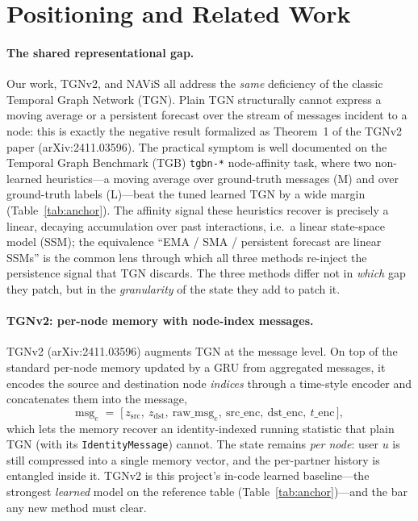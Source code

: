 \documentclass[11pt]{article}
\begin{document}
\section{Positioning and Related Work}
\label{sec:related}

\paragraph{The shared representational gap.}
Our work, TGNv2, and NAViS all address the \emph{same} deficiency of the
classic Temporal Graph Network (TGN). Plain TGN structurally cannot express a
moving average or a persistent forecast over the stream of messages incident to
a node: this is exactly the negative result formalized as Theorem~1 of the
TGNv2 paper (arXiv:2411.03596). The practical symptom is well documented on the
Temporal Graph Benchmark (TGB) \texttt{tgbn-*} node-affinity task, where two
non-learned heuristics---a moving average over ground-truth messages (M) and
over ground-truth labels (L)---beat the tuned learned TGN by a wide margin
(Table~\ref{tab:anchor}). The affinity signal these heuristics recover is
precisely a linear, decaying accumulation over past interactions, i.e.\ a linear
state-space model (SSM); the equivalence ``EMA / SMA / persistent forecast are
linear SSMs'' is the common lens through which all three methods re-inject the
persistence signal that TGN discards. The three methods differ not in
\emph{which} gap they patch, but in the \emph{granularity} of the state they add
to patch it.

\paragraph{TGNv2: per-node memory with node-index messages.}
TGNv2 (arXiv:2411.03596) augments TGN at the message level. On top of the
standard per-node memory updated by a GRU from aggregated messages, it encodes
the source and destination node \emph{indices} through a time-style encoder and
concatenates them into the message,
\[
  \mathrm{msg}_e \;=\; \bigl[\,z_{\mathrm{src}},\ z_{\mathrm{dst}},\ \mathrm{raw\_msg}_e,\ \mathrm{src\_enc},\ \mathrm{dst\_enc},\ t\text{\_enc}\,\bigr],
\]
which lets the memory recover an identity-indexed running statistic that plain
TGN (with its \texttt{IdentityMessage}) cannot. The state remains \emph{per
node}: user $u$ is still compressed into a single memory vector, and the
per-partner history is entangled inside it. TGNv2 is this project's in-code
learned baseline---the strongest \emph{learned} model on the reference table
(Table~\ref{tab:anchor})---and the bar any new method must clear.
\end{document}

